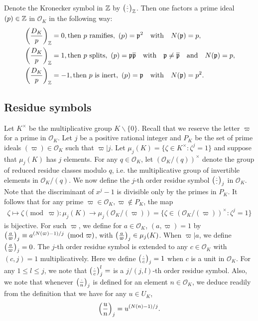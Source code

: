 \documentclass[twoside,leqno,10pt, A4]{amsart}
\begin{document}
   Denote the Kronecker symbol in $\mathbb Z$ by $\left(\frac{\cdot}{\cdot}\right)_{\mathbb Z}$.  Then one factors a prime ideal $(p) \in \mathbb Z$ in $\mathcal O_K$ in the following way:
\begin{align*}
    & \leg {D_K}{p}_{\mz} =0, \text{then $p$ ramifies}, \ (p)=\mathfrak{p}^2 \quad \text{with} \quad N(\mathfrak{p})=p, \\
    & \leg {D_K}{p}_{\mz} =1, \text{then $p$ splits}, \ (p)=\mathfrak{p}\overline{\mathfrak{p}} \quad \text{with} \quad  \mathfrak{p} \neq \overline{\mathfrak{p}}
    \quad \text{and} \quad  N(\mathfrak{p})=p, \\
    & \leg {D_K}{p}_{\mz}=-1, \text{then $p$ is inert}, \ (p)=\mathfrak{p} \quad \text{with} \quad  N(\mathfrak{p})=p^2.
\end{align*}


\subsection{Residue symbols}
\label{sec2.4}

Let $K^{\times}$ be the multiplicative group $K \backslash \{0 \}$. Recall that we reserve the letter $\varpi$ for a prime in $\mathcal O_K$. Let $j$ be a positive rational integer and $P_K$ be the set of prime ideals $(\varpi) \in \mathcal O_K$ such that $\varpi | j$.
Let $\mu_j(K)=\{ \zeta \in K^{\times}: \zeta^j=1 \}$ and suppose that $\mu_j(K)$ has $j$ elements.  For any $q \in \mathcal{O}_K$, let $\left
(\mathcal{O}_K / (q) \right )^{\times}$ denote the group of reduced residue classes modulo $q$, i.e. the multiplicative group of invertible
elements in $\mathcal{O}_K / (q)$. We now define the $j$-th order residue symbol $\left(\frac{\cdot}{\cdot}\right)_j$ in $\mathcal{O}_K $.  Note that the
discriminant of $x^j-1$ is divisible only by the primes in $P_K$. It follows that for any prime $\varpi \in \mathcal{O}_K,  \varpi \not \in
P_K$, the map
\begin{align*}
    \zeta \mapsto \zeta \pmod \varpi : \mu_j(K) \rightarrow \mu_j(\mathcal{O}_K/(\varpi))=\{ \zeta \in (\mathcal{O}_K/(\varpi))^{\times}:
\zeta^j=1 \}
\end{align*}
   is bijective. For such $\varpi$,  we define for $a \in \mathcal{O}_K$, $(a, \varpi)=1$ by $\left(\frac{a}{\varpi}\right)_j \equiv
a^{(N(\varpi)-1)/j} \pmod{\varpi}$, with $\left(\frac{a}{\varpi}\right)_j \in \mu_j(K)$. When $\varpi | a$, we define $\left(\frac{a}{\varpi}\right)_j =0$.   The $j$-th
order residue symbol is extended to any $c \in \mathcal O_K$ with $(c, j)=1$ multiplicatively. Here we define $\left(\frac{\cdot}{c}\right)_j=1$ when $c$
is a unit in $\mathcal{O}_K$. For any $1 \leq l \leq j$,  we note that $\left(\frac{\cdot}{c}\right)^l_j=$ is a $j/(j,l)$-th order residue symbol. Also, we
note that whenever $\left(\frac{\cdot}{n}\right)_j$ is defined for an element $n \in \mathcal O_K$, we deduce readily from the definition that we have for
any $u \in U_K$,
\begin{align}
\label{2.05}
  \left(\frac{u}{n}\right)_j=u^{(N(n)-1)/j}.
\end{align}
\end{document}
